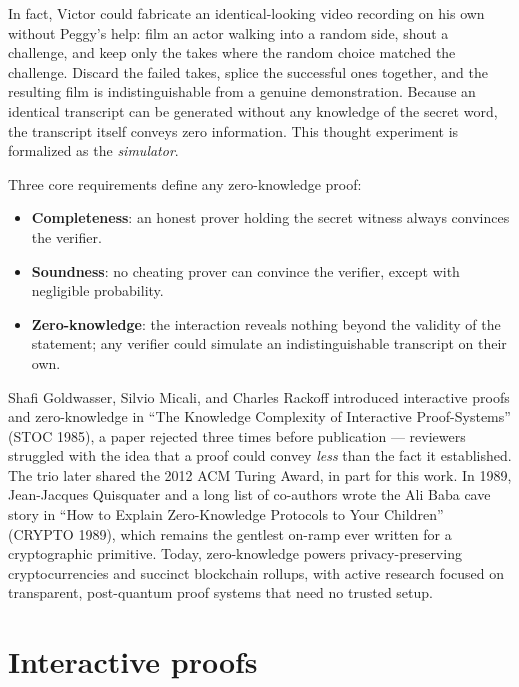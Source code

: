 In fact, Victor could fabricate an identical-looking video recording on his own without Peggy's help:
film an actor walking into a random side, shout a challenge, and keep only the takes where the random
choice matched the challenge. Discard the failed takes, splice the successful ones together, and the
resulting film is indistinguishable from a genuine demonstration. Because an identical transcript
can be generated without any knowledge of the secret word, the transcript itself conveys zero information.
This thought experiment is formalized as the \emph{simulator}.

\begin{focusbox}
Three core requirements define any zero-knowledge proof:
\begin{itemize}
  \item \textbf{Completeness}: an honest prover holding the secret witness always convinces the verifier.
  \item \textbf{Soundness}: no cheating prover can convince the verifier, except with negligible probability.
  \item \textbf{Zero-knowledge}: the interaction reveals nothing beyond the validity of the statement;
        any verifier could simulate an indistinguishable transcript on their own.
\end{itemize}
\end{focusbox}

\begin{historybox}
Shafi Goldwasser, Silvio Micali, and Charles Rackoff introduced interactive proofs and zero-knowledge in ``The Knowledge Complexity of Interactive Proof-Systems'' (STOC 1985), a paper rejected three times before publication --- reviewers struggled with the idea that a proof could convey \emph{less} than the fact it established. The trio later shared the 2012 ACM Turing Award, in part for this work. In 1989, Jean-Jacques Quisquater and a long list of co-authors wrote the Ali Baba cave story in ``How to Explain Zero-Knowledge Protocols to Your Children'' (CRYPTO 1989), which remains the gentlest on-ramp ever written for a cryptographic primitive. Today, zero-knowledge powers privacy-preserving cryptocurrencies and succinct blockchain rollups, with active research focused on transparent, post-quantum proof systems that need no trusted setup.
\end{historybox}

\section{Interactive proofs}
\label{ch31:interactive}


